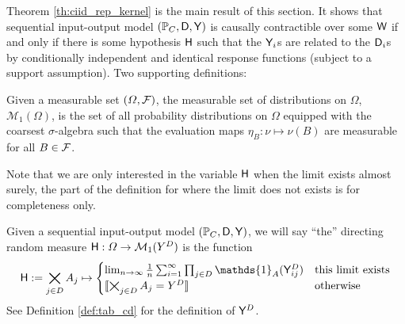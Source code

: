 Theorem \ref{th:ciid_rep_kernel} is the main result of this section. It shows that sequential input-output model $(\mathbb{P}_C,\mathsf{D},\mathsf{Y})$ is causally contractible over some $\mathsf{W}$ if and only if there is some hypothesis $\mathsf{H}$ such that the $\mathsf{Y}_i$s are related to the $\mathsf{D}_i$s by conditionally independent and identical response functions (subject to a support assumption). Two supporting definitions:

\begin{definition}
Given a measurable set $(\Omega,\mathcal{F})$, the measurable set of distributions on $\Omega$, $\mathcal{M}_1(\Omega)$, is the set of all probability distributions on $\Omega$ equipped with the coarsest $\sigma$-algebra such that the evaluation maps $\eta_B:\nu\mapsto \nu(B)$ are measurable for all $B\in \mathcal{F}$.
\end{definition}

Note that we are only interested in the variable $\mathsf{H}$ when the limit exists almost surely, the part of the definition for where the limit does not exists is for completeness only.

\begin{definition}\label{def:dir_rand_meas}
Given a sequential input-output model $(\mathbb{P}_C,\mathsf{D},\mathsf{Y})$, we will say ``the'' directing random measure $\mathsf{H}:\Omega\to \mathcal{M}_1(Y^D)$ is the function
\begin{align}
    \RV{H} := \bigtimes_{j\in D} A_j \mapsto \begin{cases}
    \lim_{n\to \infty}\frac{1}{n} \sum_{i=1}^{\infty} \prod_{j\in D} \mathds{1}_A(\RV{Y}^D_{ij}) & \text{this limit exists}\\
    \llbracket \bigtimes_{j\in D} A_j = Y^D \rrbracket &\text{otherwise}
    \end{cases} 
\end{align}
See Definition \ref{def:tab_cd} for the definition of $\mathsf{Y}^D$.
\end{definition}

